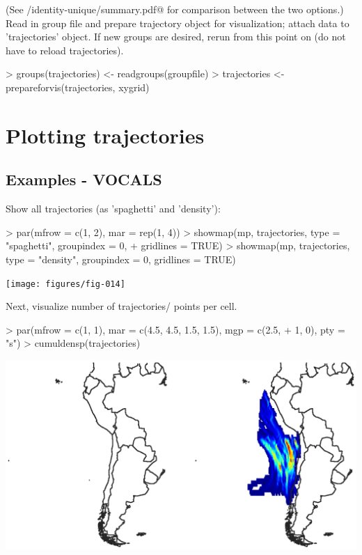 \documentclass{article}
\renewenvironment{Schunk}{\vspace{\topsep}}{\vspace{\topsep}}
\begin{document}
(See \verb@reports/identity-unique/summary.pdf@ for comparison between
the two options.)\\

Read in group file and prepare trajectory object for visualization; attach data
to 'trajectories' object. If new groups are desired, rerun from this point on
(do not have to reload trajectories).

\begin{Schunk}
\begin{Sinput}
> groups(trajectories) <- readgroups(groupfile)
> trajectories <- prepareforvis(trajectories, xygrid)
\end{Sinput}
\end{Schunk}

\section{Plotting trajectories}

\subsection{Examples - VOCALS}
Show all trajectories (as 'spaghetti' and 'density'):

\begin{Schunk}
\begin{Sinput}
> par(mfrow = c(1, 2), mar = rep(1, 4))
> showmap(mp, trajectories, type = "spaghetti", groupindex = 0, 
+     gridlines = TRUE)
> showmap(mp, trajectories, type = "density", groupindex = 0, gridlines = TRUE)
\end{Sinput}
\end{Schunk}
\texttt{[image: figures/fig-014]}

Next, visualize number of trajectories/ points per cell.

\begin{Schunk}
\begin{Sinput}
> par(mfrow = c(1, 1), mar = c(4.5, 4.5, 1.5, 1.5), mgp = c(2.5, 
+     1, 0), pty = "s")
> cumuldensp(trajectories)
\end{Sinput}
\end{Schunk}
\includegraphics{figures/fig-015}
\end{document}
